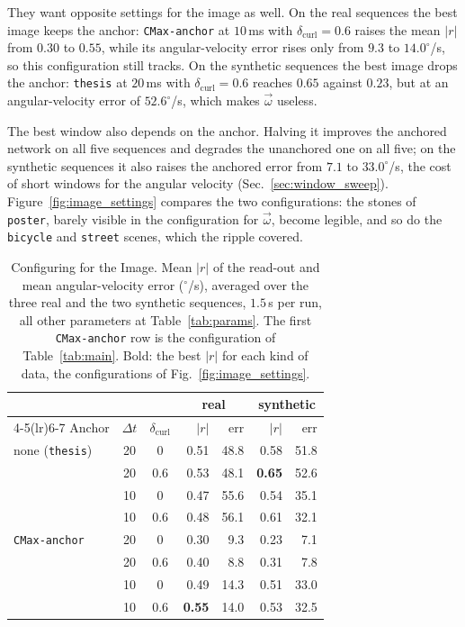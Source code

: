 \documentclass[journal]{IEEEtran}
\newcommand{\wvec}{\vec{\omega}}
\begin{document}
They want opposite settings for the image as well. On the real sequences the best image keeps the anchor: \texttt{CMax-anchor} at $10$\,ms with $\delta_{\text{curl}} = 0.6$ raises the mean $|r|$ from $0.30$ to $0.55$, while its angular-velocity error rises only from $9.3$ to $14.0^\circ$/s, so this configuration still tracks. On the synthetic sequences the best image drops the anchor: \texttt{thesis} at $20$\,ms with $\delta_{\text{curl}} = 0.6$ reaches $0.65$ against $0.23$, but at an angular-velocity error of $52.6^\circ$/s, which makes $\wvec$ useless.

The best window also depends on the anchor. Halving it improves the anchored network on all five sequences and degrades the unanchored one on all five; on the synthetic sequences it also raises the anchored error from $7.1$ to $33.0^\circ$/s, the cost of short windows for the angular velocity (Sec.~\ref{sec:window_sweep}). Figure~\ref{fig:image_settings} compares the two configurations: the stones of \texttt{poster}, barely visible in the configuration for $\wvec$, become legible, and so do the \texttt{bicycle} and \texttt{street} scenes, which the ripple covered.

\begin{table}[!t]
\renewcommand{\arraystretch}{1.15}
\caption{Configuring for the Image. \textnormal{Mean $|r|$ of the
read-out and mean angular-velocity error ($^\circ$/s), averaged over the three
real and the two synthetic sequences, $1.5$\,s per run, all other parameters
at Table~\ref{tab:params}. The first \texttt{CMax-anchor} row is the
configuration of Table~\ref{tab:main}. Bold: the best $|r|$ for each kind of
data, the configurations of Fig.~\ref{fig:image_settings}.}}
\label{tab:image}
\centering
\footnotesize
\begin{tabular}{@{}lccrrrr@{}}
\toprule
 & & & \multicolumn{2}{c}{real} & \multicolumn{2}{c}{synthetic} \\
\cmidrule(lr){4-5}\cmidrule(lr){6-7}
Anchor & $\Delta t$ & $\delta_{\text{curl}}$ & $|r|$ & err & $|r|$ & err \\
\midrule
none (\texttt{thesis}) & 20 & 0   & 0.51 & 48.8 & 0.58 & 51.8 \\
                       & 20 & 0.6 & 0.53 & 48.1 & \textbf{0.65} & 52.6 \\
                       & 10 & 0   & 0.47 & 55.6 & 0.54 & 35.1 \\
                       & 10 & 0.6 & 0.48 & 56.1 & 0.61 & 32.1 \\
\midrule
\texttt{CMax-anchor}   & 20 & 0   & 0.30 & 9.3  & 0.23 & 7.1 \\
                       & 20 & 0.6 & 0.40 & 8.8  & 0.31 & 7.8 \\
                       & 10 & 0   & 0.49 & 14.3 & 0.51 & 33.0 \\
                       & 10 & 0.6 & \textbf{0.55} & 14.0 & 0.53 & 32.5 \\
\bottomrule
\end{tabular}
\end{table}
\end{document}
